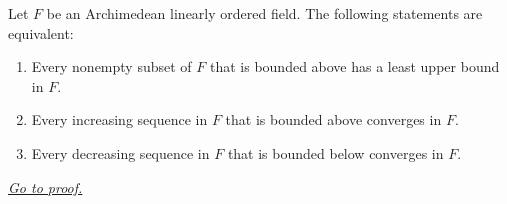 \begin{theorem}
\label{thm:lub-property-equivalent-monotone-convergence}
Let $F$ be an Archimedean linearly ordered field.  The following statements are
equivalent:
\begin{enumerate}[label=(\roman*)]
  \item Every nonempty subset of $F$ that is bounded above has a least upper
  bound in $F$.
  \item Every increasing sequence in $F$ that is bounded above converges in
  $F$.
  \item Every decreasing sequence in $F$ that is bounded below converges in
  $F$.
\end{enumerate}

\smallskip
\noindent
\hyperref[prf:lub-property-equivalent-monotone-convergence]{\textit{Go to proof.}}
\end{theorem}